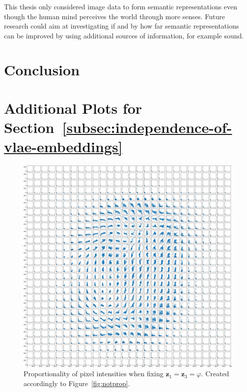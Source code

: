 \documentclass[11pt]{article}
\begin{document}
This thesis only considered image data to form semantic representations even though the human mind perceives the world through more senses.
Future research could aim at investigating if and by how far semantic representations can be improved by using additional sources of information, for example sound.

\section{Conclusion}\label{sec:conclusion}

\newpage
\printbibliography

\newpage
\appendix
\section{Additional Plots for Section~\ref{subsec:independence-of-vlae-embeddings}}\label{sec:additional-plots-for-section_independence}
\begin{figure}[H]
\centering
\includegraphics[width=\textwidth]{images/appendix_plots/notprop_1_3.png}
\caption{Proportionality of pixel intensities when fixing $\bm{z}_1 = \bm{z}_3=\varphi$. Created accordingly to Figure~\ref{fig:notprop}.}
\label{fig:notprop_1_3}
\end{figure}
\end{document}
